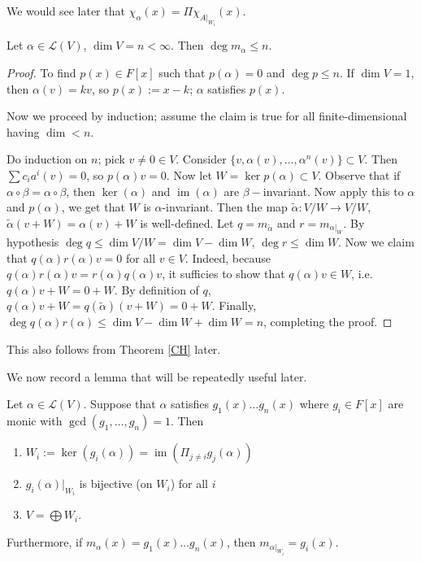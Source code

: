 \documentclass{scrartcl}
\def\le{\leqslant}
\def\L{\mathcal{L}}
\DeclareMathOperator{\im}{im}
\begin{document}
\fi
\begin{remark}
	We would see later that $\chi_\alpha(x) = \Pi \chi_{A\vert_{W_i}}(x)$.
\end{remark}
\begin{theorem}
	Let $\alpha \in \L(V)$, $\dim{V} = n < \infty$. Then $\deg{m_\alpha} \le n$.
\end{theorem}
\begin{proof}
	To find $p(x) \in F[x]$ such that $p(\alpha)=0$ and $\deg{p} \le n$. If $\dim{V} = 1$, then $\alpha(v) = kv$, so $p(x) := x-k$; $\alpha$ satisfies $p(x)$. 
	\par Now we proceed by induction; assume the claim is true for all finite-dimensional having $\dim < n$. 
	\par Do induction on $n$; pick $v\ne0 \in V$. Consider $\{v, \alpha(v), \dots, \alpha^n(v)\} \subset V$. Then $\sum c_ia^i(v)=0$, so $p(\alpha)v=0$. Now let $W = \ker p(\alpha) \subset V$. Observe that if $\alpha \circ \beta = \alpha \circ \beta$, then $\ker(\alpha)$ and $\im(\alpha)$ are $\beta-$invariant. Now apply this to $\alpha$ and $p(\alpha)$, we get that $W$ is $\alpha$-invariant. Then the map $\tilde{\alpha}: V/W \to V/W$, $\tilde{\alpha}(v+W)=\alpha(v)+W$ is well-defined. Let $q = m_{\tilde{\alpha}}$ and $r = m_{\alpha \vert_W}$. By hypothesis $\deg q \le \dim{V/W} = \dim{V}-\dim{W}$, $\deg{r} \le \dim{W}$. Now we claim that $q(\alpha)r(\alpha)v=0$ for all $v \in V$. Indeed, because $q(\alpha)r(\alpha)v = r(\alpha)q(\alpha)v$, it sufficies to show that $q(\alpha)v \in W$, i.e. $q(\alpha)v+W = 0+W$. By definition of $q$, $q(\alpha)v+W = q(\tilde{\alpha})(v+W) = 0+W$. Finally, $\deg{q(\alpha)r(\alpha)} \le \dim{V}-\dim{W}+\dim{W} = n$, completing the proof.
\end{proof}
\begin{remark}
	This also follows from Theorem \ref{CH} later.
\end{remark}
\iffalse
We now record a lemma that will be repeatedly useful later.
\begin{lemma} \label{minpoly}
	Let $\alpha \in \L(V)$. Suppose that $\alpha$ satisfies $g_1(x) \dots g_n(x)$ where $g_i \in F[x]$ are monic with $\gcd(g_1, \dots, g_n)=1$. Then
	\begin{enumerate}
		\item $W_i := \ker(g_i(\alpha)) = \im(\Pi_{j \ne i}g_j(\alpha))$
		\item $g_i(\alpha) \vert_{W_i}$ is bijective (on $W_i$) for all $i$
		\item $V = \bigoplus W_i$.
	\end{enumerate}
	Furthermore, if $m_\alpha(x)=g_1(x) \dots g_n(x)$, then $m_{\alpha \vert_{W_i}} = g_i(x)$.
\end{lemma} 
\end{document}
